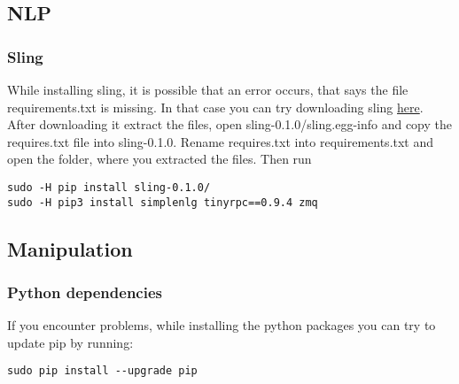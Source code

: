 \documentclass[main.tex]{subfiles}
\begin{document}
	\subsection{NLP}
	\subsubsection{Sling}
	While installing sling, it is possible that an error occurs, that says the file requirements.txt is missing. In that case you can try downloading sling \href{https://pypi.org/project/sling/#files}{here}. After downloading it extract the files, open sling-0.1.0/sling.egg-info and copy the requires.txt file into sling-0.1.0. Rename requires.txt into requirements.txt and open the folder, where you extracted the files. Then run 
	\begin{lstlisting}
sudo -H pip install sling-0.1.0/
sudo -H pip3 install simplenlg tinyrpc==0.9.4 zmq
\end{lstlisting}
	
	\subsection{Manipulation}
	\subsubsection{Python dependencies}
	If you encounter problems, while installing the python packages you can try to update pip by running:
	\begin{lstlisting}
sudo pip install --upgrade pip
\end{lstlisting}	
	
\end{document}
